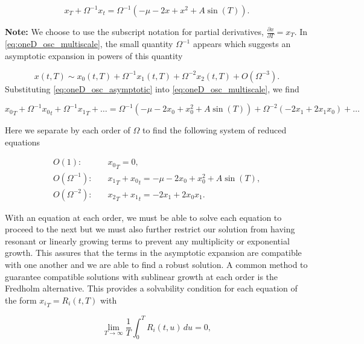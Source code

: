 \begin{equation}\label{eq:oneD_osc_multiscale}
x_T+\Omega^{-1}x_t=\Omega^{-1}\left(-\mu-2x+x^2+A\sin(T)\right).
\end{equation}

\textbf{Note:} We choose to use the subscript notation for partial derivatives, $\frac{\partial x}{\partial T}=x_T$. In \eqref{eq:oneD_osc_multiscale}, the small quantity $\Omega^{-1}$ appears which suggests an asymptotic expansion in powers of this quantity

\begin{equation}\label{eq:oneD_osc_asymptotic}
x(t,T)\sim x_0(t,T)+\Omega^{-1}x_1(t,T)+\Omega^{-2}x_2(t,T)+O(\Omega^{-3}).
\end{equation}
Substituting \eqref{eq:oneD_osc_asymptotic} into \eqref{eq:oneD_osc_multiscale}, we find

\begin{equation*}
{x_0}_T+\Omega^{-1}{x_0}_t+\Omega^{-1}{x_1}_T+\ldots=\Omega^{-1}(-\mu-2x_0+x_0^2+A\sin(T))+\Omega^{-2}(-2x_1+2x_1x_0)+\ldots
\end{equation*}

Here we separate by each order of $\Omega$ to find the following system of reduced equations

\begin{align}
\label{eq:oneD_osc_outerO1}
O(1):& \quad {x_0}_T=0, \\
\label{eq:oneD_osc_outerO2}
O(\Omega^{-1}):& \quad {x_1}_T+{x_0}_t =-\mu-2x_0+x_0^2+A\sin(T),\\
\label{eq:oneD_osc_outerO3}
O(\Omega^{-2}):& \quad {x_2}_T + {x_1}_t= -2x_1+2x_0 x_1.
\end{align}

With an equation at each order, we must be able to solve each equation to proceed to the next but we must also further restrict our solution from having resonant or linearly growing terms to prevent any multiplicity or exponential growth. This assures that the terms in the asymptotic expansion are compatible with one another and we are able to find a robust solution. A common method to guarantee compatible solutions with sublinear growth at each order is the Fredholm alternative. This provides a solvability condition for each equation of the form ${x_i}_T=R_i(t,T)$ with

\begin{equation*}
\lim\limits_{T\to\infty}\frac{1}{T}\int_0^T R_i(t,u)\,du=0,
\end{equation*}

